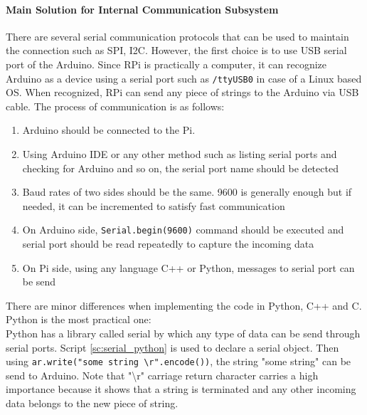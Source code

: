 \documentclass[a4paper,12pt]{article}
\begin{document}
	\paragraph{Main Solution for Internal Communication Subsystem}
	
	There are several serial communication protocols that can be used to maintain the connection such as SPI, I2C. However, the first choice is to use USB serial port of the Arduino. Since RPi is practically a computer, it can recognize Arduino as a device using a serial port such as \lstinline|/ttyUSB0| in case of a Linux based OS. When recognized, RPi can send any piece of strings to the Arduino via USB cable. The process of communication is as follows:
	\begin{enumerate}
		\item Arduino should be connected to the Pi. \vspace{-0.2cm}
		\item Using Arduino IDE or any other method such as listing serial ports and checking for Arduino and so on, the serial port name should be detected \vspace{-0.2cm}
		\item Baud rates of two sides should be the same. 9600 is generally enough but if needed, it can be incremented to satisfy fast communication \vspace{-0.2cm}
		\item On Arduino side, \texttt{Serial.begin(9600)} command should be executed and serial port should be read repeatedly to capture the incoming data \vspace{-0.2cm}
		\item On Pi side, using any language C++ or Python, messages to serial port can be send 
	\end{enumerate}
	
	There are minor differences when implementing the code in Python, C++  and C. Python is the most practical one:\\
	
	Python has a library called serial by which any type of data can be send through serial ports. Script \ref{sc:serial_python} is used to declare a serial object. Then using \texttt{ar.write("some string \textbackslash r".encode())}, the string "some string" can be send to Arduino. Note that "\textbackslash r" carriage return character carries a high importance because it shows that a string is terminated and any other incoming data belongs to the new piece of string.   \\
	
\end{document}
